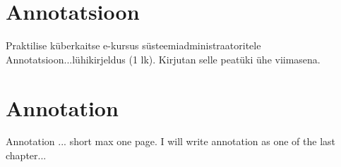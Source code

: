 \clearpage
\chapter*{Annotatsioon}
\label{annotatsioon}
\thispagestyle{empty}

Praktilise küberkaitse e-kursus süsteemiadministraatoritele
Annotatsioon...lühikirjeldus (1 lk). Kirjutan selle peatüki ühe viimasena. 


\clearpage
\chapter*{Annotation}
\label{annotation}
\thispagestyle{empty}


Annotation ... short max one page. I will write annotation as one of the last chapter...
